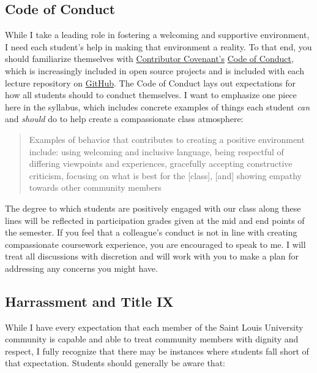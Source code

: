 \documentclass[]{book}
\theoremstyle{definition}
\theoremstyle{definition}
\theoremstyle{definition}
\theoremstyle{remark}
\begin{document}
\hypertarget{code-of-conduct}{%
\subsection{Code of Conduct}\label{code-of-conduct}}

While I take a leading role in fostering a welcoming and supportive
environment, I need each student's help in making that environment a
reality. To that end, you should familiarize themselves with
\href{https://www.contributor-covenant.org}{Contributor Covenant's}
\href{https://www.contributor-covenant.org/version/1/4/code-of-conduct}{Code
of Conduct}, which is increasingly included in open source projects and
is included with each lecture repository on
\href{https://github.com/slu-soc5050}{GitHub}. The Code of Conduct lays
out expectations for how all students should to conduct themselves. I
want to emphasize one piece here in the syllabus, which includes
concrete examples of things each student \emph{can} and \emph{should} do
to help create a compassionate class atmosphere:

\begin{quote}
Examples of behavior that contributes to creating a positive environment
include: using welcoming and inclusive language, being respectful of
differing viewpoints and experiences, gracefully accepting constructive
criticism, focusing on what is best for the {[}class{]}, {[}and{]}
showing empathy towards other community members
\end{quote}

The degree to which students are positively engaged with our class along
these lines will be reflected in participation grades given at the mid
and end points of the semester. If you feel that a colleague's conduct
is not in line with creating compassionate coursework experience, you
are encouraged to speak to me. I will treat all discussions with
discretion and will work with you to make a plan for addressing any
concerns you might have.

\hypertarget{harrassment-and-title-ix}{%
\subsection{Harrassment and Title IX}\label{harrassment-and-title-ix}}

While I have every expectation that each member of the Saint Louis
University community is capable and able to treat community members with
dignity and respect, I fully recognize that there may be instances where
students fall short of that expectation. Students should generally be
aware that:
\end{document}
